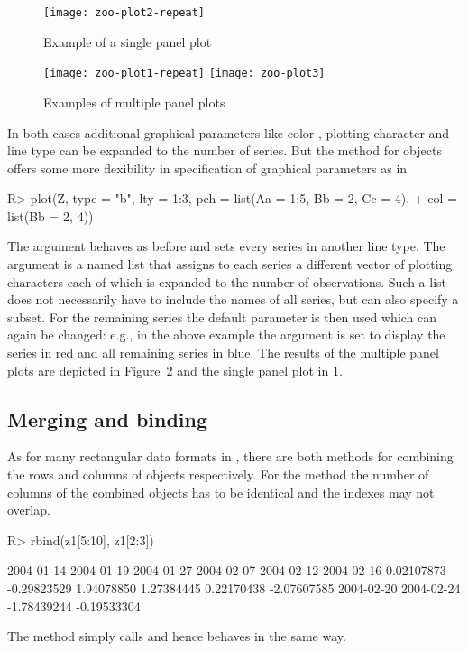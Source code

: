 \documentclass{Z}
\begin{document}
\begin{figure}[b!]
\begin{center}
\texttt{[image: zoo-plot2-repeat]}
\caption{\label{fig:plot2} Example of a single panel plot}
\end{center}
\end{figure}

\begin{figure}[p]
\begin{center}
\texttt{[image: zoo-plot1-repeat]}
\texttt{[image: zoo-plot3]}
\caption{\label{fig:plot13} Examples of multiple panel plots}
\end{center}
\end{figure}


In both cases additional graphical parameters like color ,
plotting character  and line type  can be
expanded to the number of series. But the  method for
 objects offers some more flexibility in specification
of graphical parameters as in
\begin{Schunk}
\begin{Sinput}
R> plot(Z, type = "b", lty = 1:3, pch = list(Aa = 1:5, Bb = 2, Cc = 4), 
+     col = list(Bb = 2, 4))
\end{Sinput}
\end{Schunk}
The argument  behaves as before and sets every series in another
line type. The  argument is a named list that assigns to each series
a different vector of plotting characters each of which is expanded to the 
number of observations. Such a list does not necessarily have to include the names of all
series, but can also specify a subset. For the remaining series the default parameter
is then used which can again be changed: e.g., in the above example the  argument
is set to display the series  in red and all remaining series in blue.
The results of the multiple panel plots are depicted in Figure~\ref{fig:plot13} and the
single panel plot in \ref{fig:plot2}.


\subsection{Merging and binding}
\label{sec:merge}

As for many rectangular data formats in , there are
both methods for combining the rows and columns of 
objects respectively. For the  method the number of
columns of the combined objects has to be identical and the
indexes may not overlap.
\begin{Schunk}
\begin{Sinput}
R> rbind(z1[5:10], z1[2:3])
\end{Sinput}
\begin{Soutput}
 2004-01-14  2004-01-19  2004-01-27  2004-02-07  2004-02-12  2004-02-16 
 0.02107873 -0.29823529  1.94078850  1.27384445  0.22170438 -2.07607585 
 2004-02-20  2004-02-24 
-1.78439244 -0.19533304 
\end{Soutput}
\end{Schunk}
The  method simply calls  and hence behaves in the same way.
\end{document}
